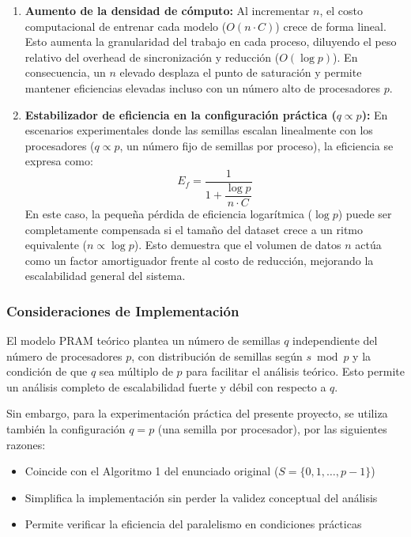 \documentclass[11pt, a4paper]{article}
\begin{document}
\begin{enumerate}
    \item \textbf{Aumento de la densidad de cómputo:} Al incrementar $n$, el costo computacional de entrenar cada modelo ($O(n \cdot C)$) crece de forma lineal. Esto aumenta la granularidad del trabajo en cada proceso, diluyendo el peso relativo del overhead de sincronización y reducción ($O(\log p)$). En consecuencia, un $n$ elevado desplaza el punto de saturación y permite mantener eficiencias elevadas incluso con un número alto de procesadores $p$.

    \item \textbf{Estabilizador de eficiencia en la configuración práctica ($q \propto p$):} En escenarios experimentales donde las semillas escalan linealmente con los procesadores ($q \propto p$, un número fijo de semillas por proceso), la eficiencia se expresa como:
    $$E_f = \frac{1}{1 + \dfrac{\log p}{n \cdot C}}$$
    En este caso, la pequeña pérdida de eficiencia logarítmica ($\log p$) puede ser completamente compensada si el tamaño del dataset crece a un ritmo equivalente ($n \propto \log p$). Esto demuestra que el volumen de datos $n$ actúa como un factor amortiguador frente al costo de reducción, mejorando la escalabilidad general del sistema.
\end{enumerate}

\subsubsection*{Consideraciones de Implementación}

El modelo PRAM teórico plantea un número de semillas $q$ independiente del número de procesadores $p$, con distribución de semillas según $s \bmod p$ y la condición de que $q$ sea múltiplo de $p$ para facilitar el análisis teórico. Esto permite un análisis completo de escalabilidad fuerte y débil con respecto a $q$.

Sin embargo, para la experimentación práctica del presente proyecto, se utiliza también la configuración $q = p$ (una semilla por procesador), por las siguientes razones:
\begin{itemize}
    \item Coincide con el Algoritmo 1 del enunciado original ($S = \{0, 1, \dots, p-1\}$)
    \item Simplifica la implementación sin perder la validez conceptual del análisis
    \item Permite verificar la eficiencia del paralelismo en condiciones prácticas
\end{itemize}
\end{document}
